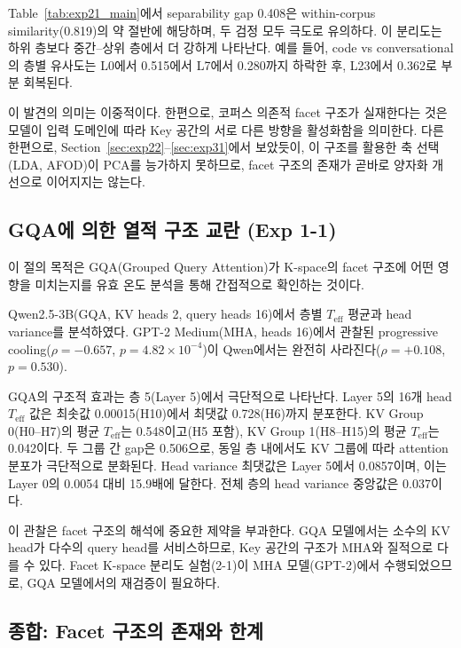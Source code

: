 \documentclass[11pt,a4paper]{article}
\newcommand{\teff}{T_\mathrm{eff}}
\begin{document}
Table~\ref{tab:exp21_main}에서 separability gap 0.408은 within-corpus similarity(0.819)의 약 절반에 해당하며, 두 검정 모두 극도로 유의하다.
이 분리도는 하위 층보다 중간--상위 층에서 더 강하게 나타난다.
예를 들어, code vs conversational의 층별 유사도는 L0에서 0.515에서 L7에서 0.280까지 하락한 후, L23에서 0.362로 부분 회복된다.

이 발견의 의미는 이중적이다.
한편으로, 코퍼스 의존적 facet 구조가 실재한다는 것은 모델이 입력 도메인에 따라 Key 공간의 서로 다른 방향을 활성화함을 의미한다.
다른 한편으로, Section~\ref{sec:exp22}--\ref{sec:exp31}에서 보았듯이, 이 구조를 활용한 축 선택(LDA, AFOD)이 PCA를 능가하지 못하므로, facet 구조의 존재가 곧바로 양자화 개선으로 이어지지는 않는다.

\subsection{GQA에 의한 열적 구조 교란 (Exp 1-1)}
\label{sec:exp11_facet}

이 절의 목적은 GQA(Grouped Query Attention)가 K-space의 facet 구조에 어떤 영향을 미치는지를 유효 온도 분석을 통해 간접적으로 확인하는 것이다.

Qwen2.5-3B(GQA, KV heads 2, query heads 16)에서 층별 $\teff$ 평균과 head variance를 분석하였다.
GPT-2 Medium(MHA, heads 16)에서 관찰된 progressive cooling($\rho = -0.657$, $p = 4.82 \times 10^{-4}$)이 Qwen에서는 완전히 사라진다($\rho = +0.108$, $p = 0.530$).

GQA의 구조적 효과는 층 5(Layer 5)에서 극단적으로 나타난다.
Layer 5의 16개 head $\teff$ 값은 최솟값 0.00015(H10)에서 최댓값 0.728(H6)까지 분포한다.
KV Group 0(H0--H7)의 평균 $\teff$는 0.548이고(H5 포함), KV Group 1(H8--H15)의 평균 $\teff$는 0.042이다.
두 그룹 간 gap은 0.506으로, 동일 층 내에서도 KV 그룹에 따라 attention 분포가 극단적으로 분화된다.
Head variance 최댓값은 Layer 5에서 0.0857이며, 이는 Layer 0의 0.0054 대비 15.9배에 달한다.
전체 층의 head variance 중앙값은 0.037이다.

이 관찰은 facet 구조의 해석에 중요한 제약을 부과한다.
GQA 모델에서는 소수의 KV head가 다수의 query head를 서비스하므로, Key 공간의 구조가 MHA와 질적으로 다를 수 있다.
Facet K-space 분리도 실험(2-1)이 MHA 모델(GPT-2)에서 수행되었으므로, GQA 모델에서의 재검증이 필요하다.

\subsection{종합: Facet 구조의 존재와 한계}
\end{document}
